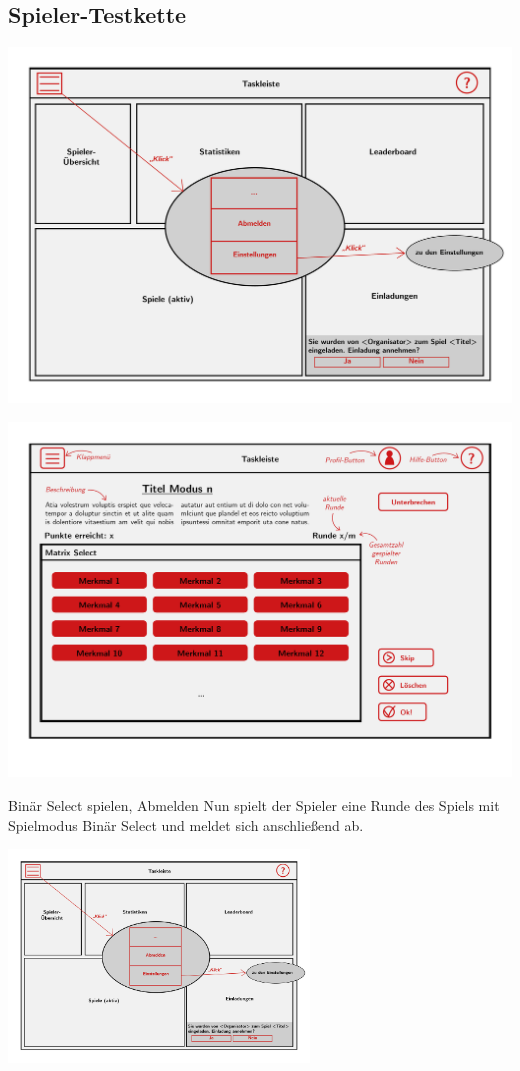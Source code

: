 \documentclass[xcolor=dvipsnames]{beamer}
\begin{document}
	\subsection{Spieler-Testkette} 
	\begin{frame}
	\includegraphics[width=\textwidth]{../../pictures/5_Spieler.jpg}
	\end{frame}
	\begin{frame}
	\includegraphics[width=\textwidth]{../../pictures/MatrixSelect.jpg}
	\end{frame}
	\begin{frame}
		\begin{block}{Binär Select spielen, Abmelden}
		Nun spielt der Spieler eine Runde des Spiels mit Spielmodus Binär Select und meldet sich anschließend ab.
		\end{block}
        \centering
		\includegraphics[width=8cm]{../../pictures/5_Spieler.jpg}
	\end{frame}
\end{document}
